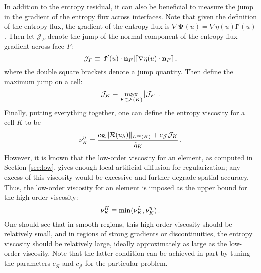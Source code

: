 In addition to the entropy residual, it can
also be beneficial to measure the jump in the gradient of the entropy flux
across interfaces.
Note that given the definition of the entropy flux, the gradient of the entropy
flux is $\nabla\mathbf{\Psi}(u)=\nabla\eta(u)\mathbf{f}'(u)$. Then let
$\mathcal{J}_F$ denote the jump of the normal component of the entropy flux
gradient across face $F$:
\begin{equation}
  \mathcal{J}_F \equiv |\mathbf{f}'(u)\cdot\mathbf{n}_F|
    [\![\nabla\eta(u)\cdot\mathbf{n}_F]\!] \,,
\end{equation}
where the double square brackets denote a jump quantity. Then define the
maximum jump on a cell:
\begin{equation}
  \mathcal{J}_K \equiv \max\limits_{F\in\mathcal{F}(K)} |\mathcal{J}_F| \,.
\end{equation}
Finally, putting everything together, one can define the entropy viscosity
for a cell $K$ to be
\begin{equation}
  \nu^\eta_K = \frac{c_\mathcal{R}\|\mathcal{R}(u_h)\|_{L^\infty(K)}
    + c_\mathcal{J}\mathcal{J}_K}{\hat{\eta}_K}
    \,.
\end{equation}
However, it is known that the low-order viscosity for an element, as computed
in Section \ref{sec:low}, gives enough local artificial diffusion for
regularization; any excess of this viscosity would be excessive and further
degrade spatial accuracy. Thus, the low-order viscosity for an element is
imposed as the upper bound for the high-order viscosity:
\begin{equation}
  \nu^H_K \equiv \min(\nu^L_K, \nu^\eta_K) \,.
\end{equation}
One should see that in smooth regions, this high-order viscosity should be
relatively small, and in regions of strong gradients or discontinuities,
the entropy viscosity should be relatively large, ideally approximately
as large as the low-order viscosity. Note that the latter condition can
be achieved in part by tuning the parameters
$c_\mathcal{R}$ and $c_\mathcal{J}$ for the particular problem.


